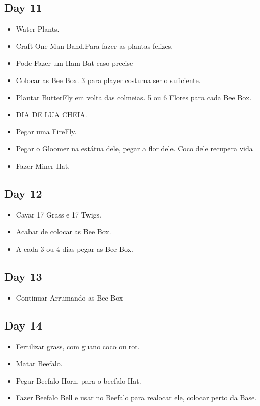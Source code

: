 \documentclass{article}
\begin{document}
\subsection{Day 11}
\begin{itemize}
    \item Water Plants.
    \item Craft One Man Band.Para fazer as plantas felizes.
    \item Pode Fazer um Ham Bat caso precise
    \item Colocar as Bee Box. 3 para player costuma ser o suficiente.
    \item Plantar ButterFly em volta das colmeias. 5 ou 6 Flores para cada Bee Box.
    \item DIA DE LUA CHEIA.
    \item Pegar uma FireFly.
    \item Pegar o Gloomer na estátua dele, pegar a flor dele. Coco dele recupera vida
    \item Fazer Miner Hat.
\end{itemize}

\subsection{Day 12}
\begin{itemize}
    \item Cavar 17 Grass e 17 Twigs. 
    \item Acabar de colocar as Bee Box.
    \item A cada 3 ou 4 dias pegar as Bee Box.
\end{itemize}

\subsection{Day 13}
\begin{itemize}
    \item Continuar Arrumando as Bee Box
\end{itemize}

\subsection{Day 14}
\begin{itemize}
    \item Fertilizar grass, com guano coco ou rot.
    \item Matar Beefalo.
    \item Pegar Beefalo Horn, para o beefalo Hat.
    \item Fazer Beefalo Bell e usar no Beefalo para realocar ele, colocar perto da Base.
\end{itemize}
\end{document}
